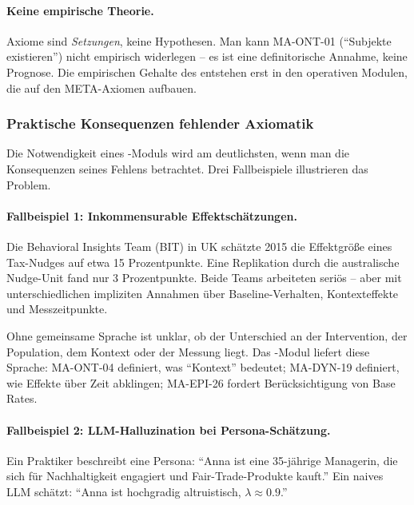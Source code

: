 \paragraph{Keine empirische Theorie.}

Axiome sind \textit{Setzungen}, keine Hypothesen. Man kann MA-ONT-01 (``Subjekte existieren'') nicht empirisch widerlegen -- es ist eine definitorische Annahme, keine Prognose. Die empirischen Gehalte des \BCM{} entstehen erst in den operativen Modulen, die auf den META-Axiomen aufbauen.

\subsubsection{Praktische Konsequenzen fehlender Axiomatik}

Die Notwendigkeit eines \META-Moduls wird am deutlichsten, wenn man die Konsequenzen seines Fehlens betrachtet. Drei Fallbeispiele illustrieren das Problem.

\paragraph{Fallbeispiel 1: Inkommensurable Effektschätzungen.}

Die Behavioral Insights Team (BIT) in UK schätzte 2015 die Effektgröße eines Tax-Nudges auf etwa 15 Prozentpunkte. Eine Replikation durch die australische Nudge-Unit fand nur 3 Prozentpunkte. Beide Teams arbeiteten seriös -- aber mit unterschiedlichen impliziten Annahmen über Baseline-Verhalten, Kontexteffekte und Messzeitpunkte.

Ohne gemeinsame Sprache ist unklar, ob der Unterschied an der Intervention, der Population, dem Kontext oder der Messung liegt. Das \META-Modul liefert diese Sprache: MA-ONT-04 definiert, was ``Kontext'' bedeutet; MA-DYN-19 definiert, wie Effekte über Zeit abklingen; MA-EPI-26 fordert Berücksichtigung von Base Rates.

\paragraph{Fallbeispiel 2: LLM-Halluzination bei Persona-Schätzung.}

Ein Praktiker beschreibt eine Persona: ``Anna ist eine 35-jährige Managerin, die sich für Nachhaltigkeit engagiert und Fair-Trade-Produkte kauft.'' Ein naives LLM schätzt: ``Anna ist hochgradig altruistisch, $\lambda \approx 0.9$.''

